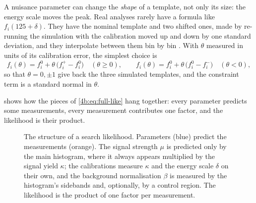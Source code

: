 A nuisance parameter can change the \emph{shape} of a template, not only its size: the
energy scale moves the peak. Real analyses rarely have a formula like
$f_i(125+\delta)$. They have the nominal template and two shifted ones, made by
re-running the simulation with the calibration moved up and down by one standard
deviation, and they interpolate between them bin by bin \cite{Cranmer2015}. With
$\theta$ measured in units of its calibration error, the simplest choice is
\begin{equation}
  f_i(\theta)=f_i^{0}+\theta\,\bigl(f_i^{+}-f_i^{0}\bigr)\quad(\theta\ge0),
  \qquad
  f_i(\theta)=f_i^{0}+\theta\,\bigl(f_i^{0}-f_i^{-}\bigr)\quad(\theta<0),
  \label{4b:eq:morph}
\end{equation}
so that $\theta=0,\pm1$ give back the three simulated templates, and the constraint
term is a standard normal in $\theta$.

 shows how the pieces of \eqref{4b:eq:full-like} hang
together: every parameter predicts some measurements, every measurement
contributes one factor, and the likelihood is their product.

\begin{figure}[htbp]
\centering
{}
\caption{The structure of a search likelihood. Parameters (blue) predict the
measurements (orange). The signal strength $\mu$ is predicted only by the main
histogram, where it always appears multiplied by the signal yield $\kappa$; the
calibrations measure $\kappa$ and the energy scale $\delta$ on their own, and the
background normalisation $\beta$ is measured by the histogram's sidebands and,
optionally, by a control region. The likelihood is the product of one factor per
measurement.}
\label{4b:fig:like-structure}
\end{figure}

